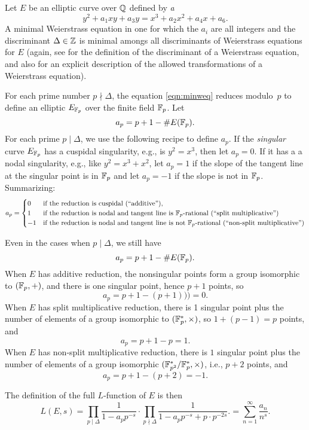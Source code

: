 Let $E$ be an elliptic curve over $\mathbb{Q}$ defined by {\em a}
\begin{equation}\label{eqn:minweq}
  y^2 + a_1 xy + a_3 y = x^3 + a_2 x^2 + a_4 x + a_6.
\end{equation}
A minimal Weierstrass equation in one for which the $a_i$
are all integers and the discriminant $\Delta\in\mathbb{Z}$ is minimal
amongs all discriminants of Weierstrass equations for $E$
(again, see \cite{silverman:aec} for the definition of the
discriminant of a Weierstrass equation, and also for an
explicit description of the allowed transformations of 
a Weierstrass equation). 

For each prime number $p\nmid \Delta$, the equation 
\eqref{eqn:minweq} reduces modulo~$p$ to define an elliptic 
$E_{\mathbb{F}_p}$ over the finite field $\mathbb{F}_p$.  Let
$$
   a_p = p + 1 - \#E(\mathbb{F}_p).
$$
For each prime $p\mid \Delta$, we use the following
recipe to define $a_p$.  If the {\em singular} curve
$E_{\mathbb{F}_p}$ has a cuspidal singularity, e.g., is
$y^2 = x^3$, then let $a_p = 0$.  If it has a a nodal
singularity, e.g., like $y^2=x^3+x^2$, let $a_p=1$
if the slope of the tangent line at the singular
point is in $\mathbb{F}_p$ and let $a_p=-1$ if the slope is
not in $\mathbb{F}_p$.  Summarizing:
$$
  a_p = \begin{cases} 
0 & \text{if the reduction is cuspidal (``additive'')},\\
1 & \text{if the reduction is nodal and tangent line is $\mathbb{F}_p$-rational (``split multiplicative'')}\\
-1 &\text{if the reduction is nodal and tangent line is not $\mathbb{F}_p$-rational (``non-split multiplicative'')}
\end{cases}
$$

Even in the cases when $p\mid \Delta$, we still have
$$
  a_p = p + 1 - \#E(\mathbb{F}_p).
$$
When $E$ has additive reduction, the nonsingular points 
form a group isomorphic to $(\mathbb{F}_p,+)$, and there is
one singular point, hence $p+1$ points,
so 
$$
  a_p = p+1 - (p+1))) = 0.
$$ When $E$
has split multiplicative reduction, there is 1 singular
point plus the number of elements of a group isomorphic to $(\mathbb{F}_p^*, \times)$,
so $1 + (p-1) = p$ points, and 
$$
  a_p = p+1-p = 1.
$$
When $E$ has non-split multiplicative
reduction, there is $1$ singular point plus the number
of elements of a group isomorphic $(\mathbb{F}_{p^2}^*/\mathbb{F}_p^*, \times)$,
i.e., $p+2$ points, and 
$$
  a_p = p+1 - (p+2) = -1.
$$

The definition of the full $L$-function of $E$ is then
$$
 L(E,s) = \prod_{p\mid \Delta} \frac{1}{1-a_p p^{-s}} \cdot
         \prod_{p\nmid \Delta} \frac{1}{1-a_p p^{-s} + p\cdot p^{-2s}}.
  = \sum_{n=1}^{\infty} \frac{a_n}{n^s}.
$$

